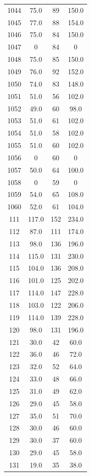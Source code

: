 \documentclass[12pt, a4paper]{report}
\begin{document}
\begin{longtable}{| c | c | c | c |}
  1044 & 75.0 & 89 & 150.0 \\
  1045 & 77.0 & 88 & 154.0 \\
  1046 & 75.0 & 84 & 150.0 \\
  1047 & 0 & 84 & 0 \\
  1048 & 75.0 & 85 & 150.0 \\
  1049 & 76.0 & 92 & 152.0 \\
  1050 & 74.0 & 83 & 148.0 \\
  1051 & 51.0 & 56 & 102.0 \\
  1052 & 49.0 & 60 & 98.0 \\
  1053 & 51.0 & 61 & 102.0 \\
  1054 & 51.0 & 58 & 102.0 \\
  1055 & 51.0 & 60 & 102.0 \\
  1056 & 0 & 60 & 0 \\
  1057 & 50.0 & 64 & 100.0 \\
  1058 & 0 & 59 & 0 \\
  1059 & 54.0 & 65 & 108.0 \\
  1060 & 52.0 & 61 & 104.0 \\
  111 & 117.0 & 152 & 234.0 \\
  112 & 87.0 & 111 & 174.0 \\
  113 & 98.0 & 136 & 196.0 \\
  114 & 115.0 & 131 & 230.0 \\
  115 & 104.0 & 136 & 208.0 \\
  116 & 101.0 & 125 & 202.0 \\
  117 & 114.0 & 147 & 228.0 \\
  118 & 103.0 & 122 & 206.0 \\
  119 & 114.0 & 139 & 228.0 \\
  120 & 98.0 & 131 & 196.0 \\
  121 & 30.0 & 42 & 60.0 \\
  122 & 36.0 & 46 & 72.0 \\
  123 & 32.0 & 52 & 64.0 \\
  124 & 33.0 & 48 & 66.0 \\
  125 & 31.0 & 49 & 62.0 \\
  126 & 29.0 & 45 & 58.0 \\
  127 & 35.0 & 51 & 70.0 \\
  128 & 30.0 & 46 & 60.0 \\
  129 & 30.0 & 37 & 60.0 \\
  130 & 29.0 & 45 & 58.0 \\
  131 & 19.0 & 35 & 38.0 \\

\end{longtable}
\end{document}
